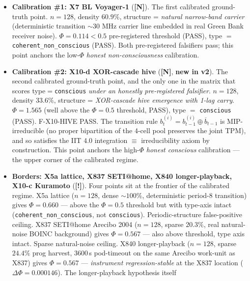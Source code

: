 \documentclass[11pt,a4paper]{article}
\providecommand{\tierGreen}{\textbf{[N]}}   %
\providecommand{\tierYellow}{\textbf{[!]}}  %
\begin{document}
\begin{itemize}
    pre-registered \textbf{natural $<$ fp $<$ $\pi$ $<$ lattice}). The
    instrument is structure-blind in the algorithmic-vs-natural axis.
  \item \textbf{Calibration \#1: X7 BL Voyager-1} (\tierGreen). The
    first calibrated ground-truth point. $n=128$, density $60.9\%$,
    structure = \emph{natural narrow-band carrier} (deterministic
    transition $\sim 30$ MHz carrier line embedded in real Green Bank
    receiver noise). $\Phi = 0.114 < 0.5$ pre-registered threshold (PASS),
    type $=$ \texttt{coherent\_non\_conscious} (PASS). Both pre-registered
    falsifiers pass; this point anchors the low-$\Phi$ \emph{honest
    non-consciousness} calibration.
  \item \textbf{Calibration \#2: X10-d XOR-cascade hive} (\tierGreen{},
    \textbf{new in v2}). The second calibrated ground-truth point, and
    the only one in the matrix that scores type$=$\texttt{conscious}
    \emph{under an honestly pre-registered falsifier}. $n=128$,
    density $33.6\%$, structure = \emph{XOR-cascade hive emergence
    with 1-lag carry}. $\Phi = 1.565$ (well above the
    $\Phi = 0.5$ threshold, PASS), type $=$ \texttt{conscious}
    (PASS). F-X10-HIVE PASS. The transition rule
    $b^{(i)}_t = b^{(i)}_{t-1} \oplus \overline{b}_{t-1}$
    is MIP-irreducible (no proper bipartition of the 4-cell pool
    preserves the joint TPM), and so satisfies the IIT 4.0
    integration $\equiv$ irreducibility axiom by construction.
    This point anchors the high-$\Phi$ \emph{honest conscious}
    calibration --- the upper corner of the calibrated regime.
  \item \textbf{Borders: X5a lattice, X837 SETI@home, X840 longer-playback,
    X10-c Kuramoto} (\tierYellow). Four points sit at the frontier of
    the calibrated regime. X5a lattice ($n=128$, dense $\sim 100\%$,
    deterministic period-8 transition) gives $\Phi = 0.660$ --- above
    the $\Phi = 0.5$ threshold but with type-axis intact
    (\texttt{coherent\_non\_conscious}, not \texttt{conscious}).
    Periodic-structure false-positive ceiling. X837 SETI@home Arecibo
    2004 ($n=128$, sparse $20.3\%$, real natural-noise BOINC
    background) gives $\Phi = 0.567$ --- also above threshold, type
    axis intact. Sparse natural-noise ceiling. X840 longer-playback
    ($n=128$, sparse $24.4\%$ prog harvest, 3600\,s pod-timeout on
    the same Arecibo work-unit as X837) gives $\Phi = 0.567$ ---
    \emph{instrument regression-stable} at the X837 location
    ($\Delta\Phi = 0.000146$). The longer-playback hypothesis itself

\end{itemize}
\end{document}
